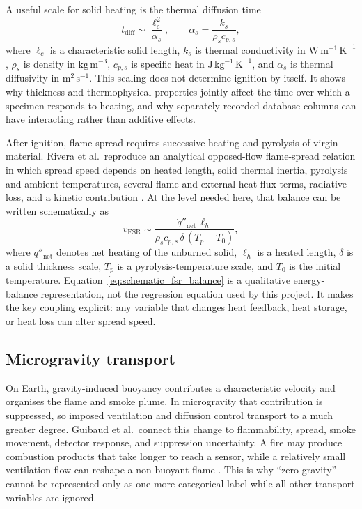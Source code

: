 A useful scale for solid heating is the thermal diffusion time
\begin{equation}
    t_{\mathrm{diff}} \sim \frac{\ell_c^2}{\alpha_s},
    \qquad
    \alpha_s=\frac{k_s}{\rho_s c_{p,s}},
    \label{eq:thermal_diffusion_time}
\end{equation}
where \(\ell_c\) is a characteristic solid length, \(k_s\) is thermal conductivity in \(\mathrm{W\,m^{-1}\,K^{-1}}\), \(\rho_s\) is density in \(\mathrm{kg\,m^{-3}}\), \(c_{p,s}\) is specific heat in \(\mathrm{J\,kg^{-1}\,K^{-1}}\), and \(\alpha_s\) is thermal diffusivity in \(\mathrm{m^2\,s^{-1}}\). This scaling does not determine ignition by itself. It shows why thickness and thermophysical properties jointly affect the time over which a specimen responds to heating, and why separately recorded database columns can have interacting rather than additive effects.

After ignition, flame spread requires successive heating and pyrolysis of virgin material. Rivera et al.\ reproduce an analytical opposed-flow flame-spread relation in which spread speed depends on heated length, solid thermal inertia, pyrolysis and ambient temperatures, several flame and external heat-flux terms, radiative loss, and a kinetic contribution \cite{riveraWireML}. At the level needed here, that balance can be written schematically as
\begin{equation}
    v_{\mathrm{FSR}}
    \sim
    \frac{\dot{q}''_{\mathrm{net}}\,\ell_h}
         {\rho_s c_{p,s}\,\delta\,(T_p-T_0)},
    \label{eq:schematic_fsr_balance}
\end{equation}
where \(\dot{q}''_{\mathrm{net}}\) denotes net heating of the unburned solid, \(\ell_h\) is a heated length, \(\delta\) is a solid thickness scale, \(T_p\) is a pyrolysis-temperature scale, and \(T_0\) is the initial temperature. Equation~\eqref{eq:schematic_fsr_balance} is a qualitative energy-balance representation, not the regression equation used by this project. It makes the key coupling explicit: any variable that changes heat feedback, heat storage, or heat loss can alter spread speed.

\subsection{Microgravity transport}

On Earth, gravity-induced buoyancy contributes a characteristic velocity and organises the flame and smoke plume. In microgravity that contribution is suppressed, so imposed ventilation and diffusion control transport to a much greater degree. Guibaud et al.\ connect this change to flammability, spread, smoke movement, detector response, and suppression uncertainty. A fire may produce combustion products that take longer to reach a sensor, while a relatively small ventilation flow can reshape a non-buoyant flame \cite{guibaud2022spacecraft}. This is why ``zero gravity'' cannot be represented only as one more categorical label while all other transport variables are ignored.

